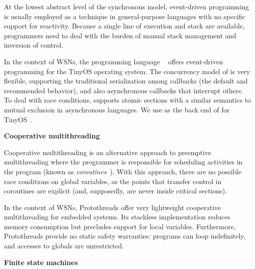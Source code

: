 At the lowest abstract level of the synchronous model, event-driven programming 
is usually employed as a technique in general-purpose languages with no 
specific support for reactivity.
Because a single line of execution and stack are available, programmers need to 
deal with the burden of manual stack management and inversion of 
control.~\cite{sync_async.cooperative}

In the context of WSNs, the programming language \nesc~\cite{wsn.nesc} offers 
event-driven programming for the TinyOS operating system.
The concurrency model of \nesc is very flexible, supporting the traditional 
serialization among callbacks (the default and recommended behavior), and also 
asynchronous callbacks that interrupt others.
To deal with race conditions, \nesc supports atomic sections with a similar 
semantics to mutual exclusion in asynchronous languages.
We use \nesc as the back end of \CEU for TinyOS~\cite{wsn.tos}.

\textbf{Cooperative multithreading}

Cooperative multithreading is an alternative approach to preemptive 
multithreading where the programmer is responsible for scheduling activities in 
the program (known as \emph{coroutines}~\cite{lua.coroutines}).
With this approach, there are no possible race conditions on global variables, 
as the points that transfer control in coroutines are explicit (and, 
supposedly, are never inside critical sections).

In the context of WSNs, Protothreads \cite{wsn.protothreads} offer very 
lightweight cooperative multithreading for embedded systems.
Its stackless implementation reduces memory consumption but precludes support 
for local variables.
Furthermore, Protothreads provide no static safety warranties: programs can 
loop indefinitely, and accesses to globals are unrestricted.

\textbf{Finite state machines}

